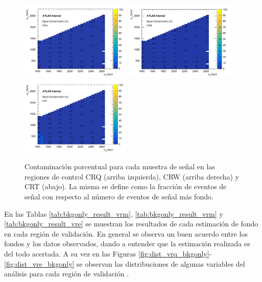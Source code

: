 \begin{figure}[ht!]

  \centering
  \includegraphics[width=0.47\textwidth]{images_tmp/results/signal_contamination_bb_CRQ_139ifb.pdf}
  \includegraphics[width=0.47\textwidth]{images_tmp/results/signal_contamination_bb_CRW_139ifb.pdf}
  \includegraphics[width=0.47\textwidth]{images_tmp/results/signal_contamination_bb_CRT_139ifb.pdf}
  \caption{Contaminación porcentual para cada muestra de señal en las regiones de control CRQ (arriba izquierda), CRW (arriba derecha) y CRT (abajo). La misma se define como la fracción de eventos de señal con respecto al número de eventos de señal más fondo.}
  \label{fig:signal_contamination_CR_bb}

\end{figure}


En las Tablas \ref{tab:bkgonly_result_vrm}, \ref{tab:bkgonly_result_vrm} y \ref{tab:bkgonly_result_vre} se muestran los resultados de cada estimación de fondo en cada región de validación. En general se observa un buen acuerdo entre los fondos y los datos observados, dando a entender que la estimación realizada es del todo acertada. 
A su vez en las Figuras \ref{fig:dist_vrq_bkgonly}-\ref{fig:dist_vre_bkgonly} 
se observan las distribuciones de algunas variables del análisis para cada región de validación .

